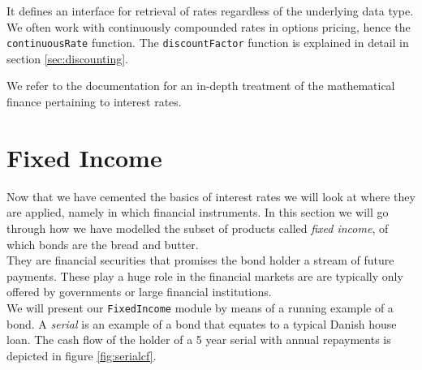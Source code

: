 It defines an interface for retrieval of rates regardless of the underlying
data type. We often work with continuously compounded rates in options 
pricing\cite{HULL}, hence the \texttt{continuousRate} function. The
\texttt{discountFactor} function is explained in detail in section
\ref{sec:discounting}.


We refer to the documentation\cite{hqldoc} for an in-depth treatment of the
mathematical finance pertaining to interest rates.


\section{Fixed Income}

Now that we have cemented the basics of interest rates we will look at 
where they are applied, namely in which financial instruments. In this section
we will go through how we have modelled the subset of products called 
\emph{fixed income}, of which bonds are the bread and butter.\\
They are financial securities that promises the bond holder a
stream of future payments. These play a huge role in the financial markets are
are typically only offered by governments or large financial institutions.\\

We will present our \texttt{FixedIncome} module by means of a running example
of a bond. 
A \emph{serial} is an example of a bond that equates to a typical Danish house
loan. The cash flow of the holder of a 5 year serial with annual repayments is
depicted in figure \ref{fig:serialcf}.\\


